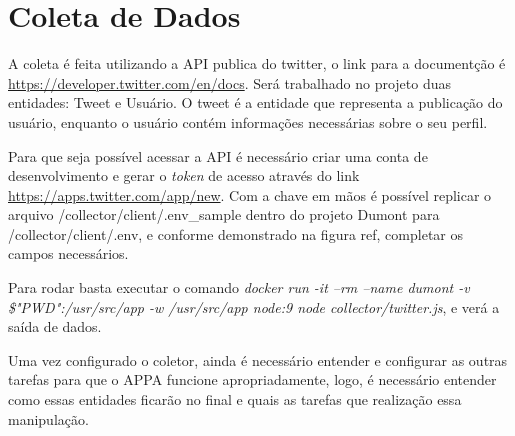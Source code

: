 \section{Coleta de Dados}
A coleta é feita utilizando a API publica do twitter, o link para a documentção é \url{https://developer.twitter.com/en/docs}. Será trabalhado no projeto duas entidades: Tweet e Usuário. O tweet é a entidade que representa a publicação do usuário, enquanto o usuário contém informações necessárias sobre o seu perfil.

Para que seja possível acessar a API é necessário criar uma conta de desenvolvimento e gerar o \textit{token} de acesso através do link \url{https://apps.twitter.com/app/new}. Com a chave em mãos é possível replicar o arquivo /collector/client/.env\_sample dentro do projeto Dumont para /collector/client/.env, e conforme demonstrado na figura {ref}, completar os campos necessários.

Para rodar basta executar o comando \textit{docker run -it --rm --name dumont -v \$"PWD":/usr/src/app -w /usr/src/app node:9 node collector/twitter.js}, e verá a saída de dados.

Uma vez configurado o coletor, ainda é necessário entender e configurar as outras tarefas para que o APPA funcione apropriadamente, logo, é necessário entender como essas entidades ficarão no final e quais as tarefas que realização essa manipulação.

